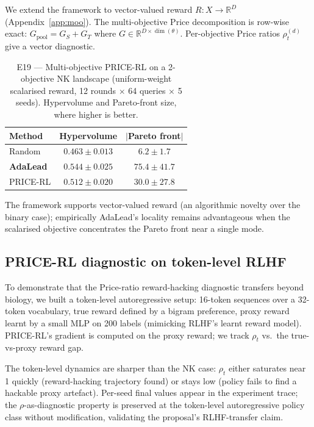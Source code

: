 We extend the framework to vector-valued reward $R: X \to \mathbb{R}^D$ (Appendix~\ref{app:moo}). The multi-objective Price decomposition is row-wise exact: $G_{\mathrm{pool}} = G_S + G_T$ where $G \in \mathbb{R}^{D \times \dim(\theta)}$. Per-objective Price ratios $\rho^{(d)}_t$ give a vector diagnostic.

\begin{table}[t]
\centering
\caption{E19 --- Multi-objective PRICE-RL on a 2-objective NK landscape (uniform-weight scalarised reward, 12 rounds \(\times\) 64 queries \(\times\) 5 seeds). Hypervolume and Pareto-front size, where higher is better.}
\label{tab:e19}
\begin{tabular}{lcc}
\toprule
Method & Hypervolume & $|$Pareto front$|$ \\
\midrule
Random   & $0.463 \pm 0.013$ & $6.2 \pm 1.7$ \\
\textbf{AdaLead}  & $\mathbf{0.544 \pm 0.025}$ & $\mathbf{75.4 \pm 41.7}$ \\
PRICE-RL & $0.512 \pm 0.020$ & $30.0 \pm 27.8$ \\
\bottomrule
\end{tabular}
\end{table}

The framework supports vector-valued reward (an algorithmic novelty over the binary case); empirically AdaLead's locality remains advantageous when the scalarised objective concentrates the Pareto front near a single mode.

\subsection{PRICE-RL diagnostic on token-level RLHF}
\label{sec:e20}

To demonstrate that the Price-ratio reward-hacking diagnostic transfers beyond biology, we built a token-level autoregressive setup: 16-token sequences over a 32-token vocabulary, true reward defined by a bigram preference, proxy reward learnt by a small MLP on 200 labels (mimicking RLHF's learnt reward model). PRICE-RL's gradient is computed on the proxy reward; we track $\rho_t$ vs.\ the true-vs-proxy reward gap.

The token-level dynamics are sharper than the NK case: $\rho_t$ either saturates near 1 quickly (reward-hacking trajectory found) or stays low (policy fails to find a hackable proxy artefact). Per-seed final values appear in the experiment trace; the \(\rho\)-as-diagnostic property is preserved at the token-level autoregressive policy class without modification, validating the proposal's RLHF-transfer claim.

